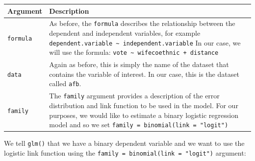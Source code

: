 \documentclass[]{article}
\begin{document}
\begin{longtable}[]{@{}ll@{}}
\toprule
\begin{minipage}[b]{0.11\columnwidth}\raggedright
Argument\strut
\end{minipage} & \begin{minipage}[b]{0.83\columnwidth}\raggedright
Description\strut
\end{minipage}\tabularnewline
\midrule
\endhead
\begin{minipage}[t]{0.11\columnwidth}\raggedright
\texttt{formula}\strut
\end{minipage} & \begin{minipage}[t]{0.83\columnwidth}\raggedright
As before, the \texttt{formula} describes the relationship between the dependent and independent variables, for example \texttt{dependent.variable\ \textasciitilde{}\ independent.variable} In our case, we will use the formula: \texttt{vote\ \textasciitilde{}\ wifecoethnic\ +\ distance}\strut
\end{minipage}\tabularnewline
\begin{minipage}[t]{0.11\columnwidth}\raggedright
\texttt{data}\strut
\end{minipage} & \begin{minipage}[t]{0.83\columnwidth}\raggedright
Again as before, this is simply the name of the dataset that contains the variable of interest. In our case, this is the dataset called \texttt{afb}.\strut
\end{minipage}\tabularnewline
\begin{minipage}[t]{0.11\columnwidth}\raggedright
\texttt{family}\strut
\end{minipage} & \begin{minipage}[t]{0.83\columnwidth}\raggedright
The \texttt{family} argument provides a description of the error distribution and link function to be used in the model. For our purposes, we would like to estimate a binary logistic regression model and so we set \texttt{family\ =\ binomial(link\ =\ "logit")}\strut
\end{minipage}\tabularnewline
\bottomrule
\end{longtable}

We tell \texttt{glm()} that we have a binary dependent variable and we want to use the logistic link function using the \texttt{family\ =\ binomial(link\ =\ "logit")} argument:
\end{document}

